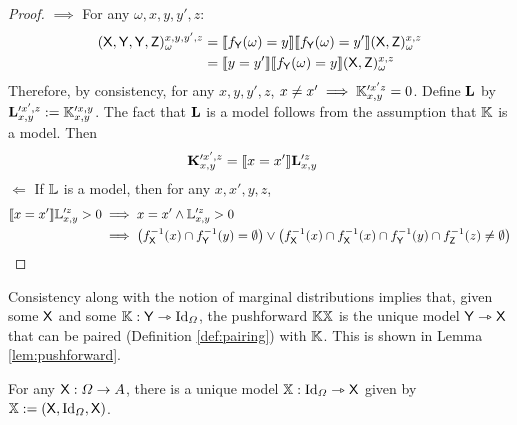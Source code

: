 \begin{proof}
$\implies$
For any $\omega,x,y,y',z$:
\begin{align}
	(\mathsf{X},\mathsf{Y},\mathsf{Y},\mathsf{Z})_\omega^{x,y,y',z} &= \llbracket f_{\mathsf{Y}}(\omega)=y \rrbracket \llbracket f_{\mathsf{Y}}(\omega)=y' \rrbracket (\mathsf{X},\mathsf{Z})_\omega^{x,z} \\
	&= \llbracket y=y' \rrbracket \llbracket f_{\mathsf{Y}}(\omega)=y \rrbracket(\mathsf{X},\mathsf{Z})_\omega^{x,z}
\end{align}
Therefore, by consistency, for any $x,y,y',z$, $x\neq x'\implies \mathbb{K}_{x,y}^{\prime x'z}=0$. Define $\mathbf{L}$ by $\mathbf{L}_{x,y}^{\prime x', z} := \mathbb{K}_{x,y}^{\prime x, y}$. The fact that $\mathbf{L}$ is a model follows from the assumption that $\mathbb{K}$ is a model. Then
\begin{align}
	\mathbf{K}_{x, y}^{\prime x', z} &= \llbracket x=x' \rrbracket\mathbf{L}_{x,y}^{\prime z}
\end{align}
$\Leftarrow$
If $\mathbb{L}$ is a model, then for any $x,x',y,z$, 
\begin{align}
\llbracket x=x'\rrbracket \mathbb{L}_{ x,y}^{\prime z}>0&\implies x=x'\land \mathbb{L}_{ x,y}^{\prime z}>0\\
													  &\implies \left( f_{\mathsf{X}}^{-1}(x)\cap f_{\mathsf{Y}}^{-1}(y)=\emptyset \right)\lor \left(f_{\mathsf{X}}^{-1}(x)\cap f_{\mathsf{X}}^{-1}(x)\cap f_{\mathsf{Y}}^{-1}(y)\cap f_{\mathsf{Z}}^{-1}(z)\neq\emptyset \right)\\
\end{align}
\end{proof}

Consistency along with the notion of marginal distributions implies that, given some $\mathsf{X}$ and some $\mathbb{K}:\mathsf{Y}\rightarrowtriangle\text{Id}_\Omega$, the pushforward $\mathbb{K}\mathbb{X}$ is the unique model $\mathsf{Y}\rightarrowtriangle \mathsf{X}$ that can be paired (Definition \ref{def:pairing}) with $\mathbb{K}$. This is shown in Lemma \ref{lem:pushforward}.

\begin{lemma}\label{lem:uniq_model}
For any $\mathsf{X}:\Omega\to A$, there is a unique model $\mathbb{X}:\text{Id}_\Omega\rightarrowtriangle \mathsf{X}$ given by $\mathbb{X}:=(\mathsf{X},\text{Id}_\Omega,\mathsf{X})$.
\end{lemma}

